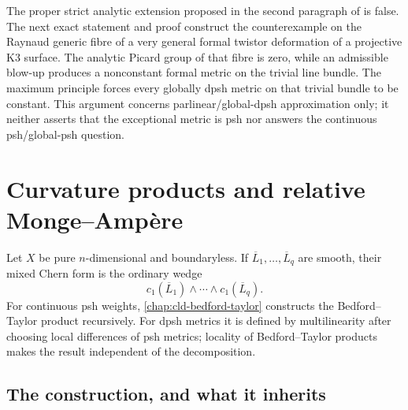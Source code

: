 


The proper strict analytic extension proposed in the second paragraph of
\cite[Remark~17.8.10]{CLD25} is false.  The next exact statement and proof
construct the counterexample on the Raynaud generic fibre of a very general
formal twistor deformation of a projective K3 surface.  The analytic Picard
group of that fibre is zero, while an admissible blow-up produces a
nonconstant formal metric on the trivial line bundle.  The maximum principle
forces every globally dpsh metric on that trivial bundle to be constant.
This argument concerns parlinear/global-dpsh approximation only; it neither
asserts that the exceptional metric is psh nor answers the continuous
psh/global-psh question.




\section{Curvature products and relative Monge--Amp\`ere}
\label{sec:ch17-products}

Let $X$ be pure $n$-dimensional and boundaryless.  If
$\overline L_1,\ldots,\overline L_q$ are smooth, their mixed Chern form is
the ordinary wedge
\[
             c_1(\overline L_1)\wedge\cdots\wedge
             c_1(\overline L_q).
\]
For continuous psh weights, \cref{chap:cld-bedford-taylor} constructs the Bedford--Taylor
product recursively.  For dpsh metrics it is defined by multilinearity after
choosing local differences of psh metrics; locality of Bedford--Taylor
products makes the result independent of the decomposition.

\subsection{The construction, and what it inherits}
\label{sec:ch17-product-construction}

